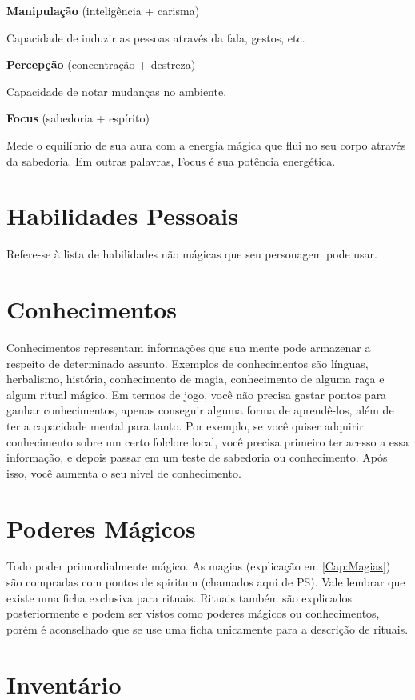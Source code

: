 \textbf{Manipulação} (inteligência + carisma)

Capacidade de induzir as pessoas através da fala, gestos, etc. 

\textbf{Percepção} (concentração + destreza)

Capacidade de notar mudanças no ambiente.

\textbf{Focus} (sabedoria + espírito)

Mede o equilíbrio de sua aura com a energia mágica que flui no seu corpo através da sabedoria. Em outras palavras, Focus é sua potência energética.

\section{Habilidades Pessoais}

Refere-se à lista de habilidades não mágicas que seu personagem pode usar. 

\section{Conhecimentos}

Conhecimentos representam informações que sua mente pode armazenar a respeito de determinado assunto. Exemplos de conhecimentos são línguas, herbalismo, história, conhecimento de magia, conhecimento de alguma raça e algum ritual mágico. Em termos de jogo, você não precisa gastar pontos para ganhar conhecimentos, apenas conseguir alguma forma de aprendê-los, além de ter a capacidade mental para tanto. 
Por exemplo, se você quiser adquirir conhecimento sobre um certo folclore local, você precisa primeiro ter acesso a essa informação, e depois passar em um teste de sabedoria ou conhecimento. Após isso, você aumenta o seu nível de conhecimento.

\section{Poderes Mágicos}

Todo poder primordialmente mágico. As magias (explicação em \ref{Cap:Magias}) são compradas com pontos de spiritum (chamados aqui de PS). Vale lembrar que existe uma ficha exclusiva para rituais. Rituais também são explicados posteriormente e podem ser vistos como poderes mágicos ou conhecimentos, porém é aconselhado que se use uma ficha unicamente para a descrição de rituais.

\section{Inventário} 

